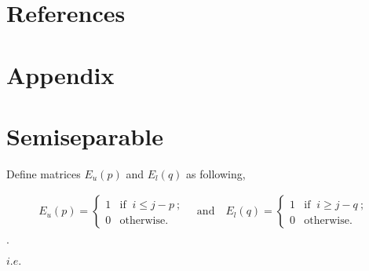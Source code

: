 \documentclass[11pt]{article}
\begin{document}
\section*{References}

\section*{Appendix}

\newpage


\section{Semiseparable}

Define matrices $E_{u}(p)$ and $E_{l}(q)$ as following,

\begin{align}
    E_{u}(p) = \begin{cases}
        1 &  \text{if }\ i \leqslant j - p \ ; \\ 
        0 &  \text{otherwise}.
    \end{cases}
     \quad\text{and}\quad 
    E_{l}(q) = \begin{cases}
        1 &  \text{if }\ i \geqslant j - q \ ; \\ 
        0 &  \text{otherwise}.
    \end{cases}
\end{align}.


$i.e.$
\end{document}
